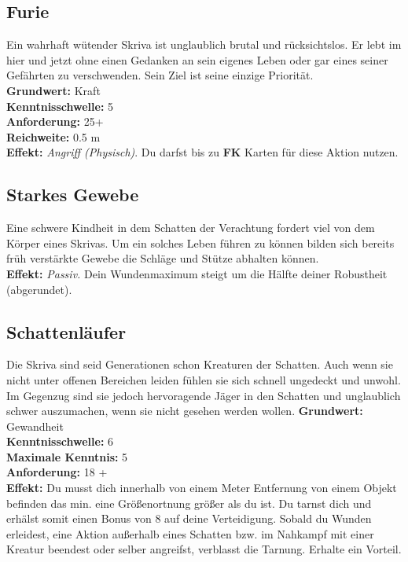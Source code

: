 \subsection*{Furie} \label{sk:furie}
Ein wahrhaft wütender Skriva ist unglaublich brutal und rücksichtslos. Er lebt im hier und jetzt ohne einen Gedanken an sein eigenes Leben oder gar eines seiner Gefährten zu verschwenden. Sein Ziel ist seine einzige Priorität. \\
\textbf{Grundwert:} Kraft \\
\textbf{Kenntnisschwelle:} 5 \\
\textbf{Anforderung:} 25+ \\
\textbf{Reichweite:} 0.5 m \\
\textbf{Effekt:} \textit{Angriff (Physisch)}. Du darfst bis zu \textbf{FK} Karten für diese Aktion nutzen.

\subsection*{Starkes Gewebe} \label{sk:starkes_gewebe}
Eine schwere Kindheit in dem Schatten der Verachtung fordert viel von dem Körper eines Skrivas. Um ein solches Leben führen zu können bilden sich bereits früh verstärkte Gewebe die Schläge und Stütze abhalten können. \\
\textbf{Effekt:} \textit{Passiv.} Dein Wundenmaximum steigt um die Hälfte deiner Robustheit (abgerundet).

\subsection*{Schattenläufer} \label{sk:schattenläufer}
Die Skriva sind seid Generationen schon Kreaturen der Schatten. Auch wenn sie nicht unter offenen Bereichen leiden fühlen sie sich schnell ungedeckt und unwohl. Im Gegenzug sind sie jedoch hervoragende Jäger in den Schatten und unglaublich schwer auszumachen, wenn sie nicht gesehen werden wollen.
\textbf{Grundwert:} Gewandheit \\
\textbf{Kenntnisschwelle:} 6 \\
\textbf{Maximale Kenntnis:} 5 \\
\textbf{Anforderung:} 18 +\\
\textbf{Effekt:} Du musst dich innerhalb von einem Meter Entfernung von einem Objekt befinden das min. eine Größenortnung größer als du ist. Du tarnst dich und erhälst somit einen Bonus von 8 auf deine Verteidigung. Sobald du Wunden erleidest, eine Aktion außerhalb eines Schatten bzw. im Nahkampf mit einer Kreatur beendest oder selber angreifst, verblasst die Tarnung. Erhalte ein Vorteil.

